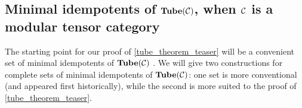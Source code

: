 \subsection{Minimal idempotents of $\textbf{Tube}(\mathcal{C})$, when $\mathcal{C}$ is a modular tensor category}   \label{mtc_idem_subsect}

The starting point for our proof of \eqref{tube_theorem_teaser} will be
a convenient set of minimal idempotents of $\textbf{Tube}(\mathcal{C})$ \cite{ocneanu1994}. 
We will give two constructions for complete sets of minimal idempotents of $\textbf{Tube}(\mathcal{C})$:
one set is more conventional (and appeared first historically), while the second 
is more suited to the proof of \eqref{tube_theorem_teaser}.

